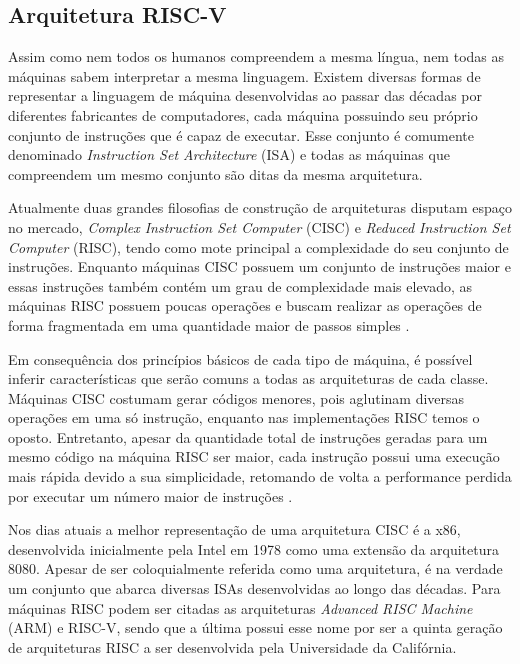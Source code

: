 \subsection{Arquitetura RISC-V}

Assim como nem todos os humanos compreendem a mesma língua, nem todas as máquinas sabem interpretar a mesma linguagem. Existem diversas formas de representar a linguagem de máquina desenvolvidas ao passar das décadas por diferentes fabricantes de computadores, cada máquina possuindo seu próprio conjunto de instruções que é capaz de executar. Esse conjunto é comumente denominado \textit{Instruction Set Architecture} (ISA) e todas as máquinas que compreendem um mesmo conjunto são ditas da mesma arquitetura.

Atualmente duas grandes filosofias de construção de arquiteturas disputam espaço no mercado, \textit{Complex Instruction Set Computer} (CISC) e \textit{Reduced Instruction Set Computer} (RISC), tendo como mote principal a complexidade do seu conjunto de instruções. Enquanto máquinas CISC possuem um conjunto de instruções maior e essas instruções também contém um grau de complexidade mais elevado, as máquinas RISC possuem poucas operações e buscam realizar as operações de forma fragmentada em uma quantidade maior de passos simples \cite{patterson_risc_i}.

Em consequência dos princípios básicos de cada tipo de máquina, é possível inferir características que serão comuns a todas as arquiteturas de cada classe. Máquinas CISC costumam gerar códigos menores, pois aglutinam diversas operações em uma só instrução, enquanto nas implementações RISC temos o oposto. Entretanto, apesar da quantidade total de instruções geradas para um mesmo código na máquina RISC ser maior, cada instrução possui uma execução mais rápida devido a sua simplicidade, retomando de volta a performance perdida por executar um número maior de instruções \cite{patterson_risc_i}.

Nos dias atuais a melhor representação de uma arquitetura CISC é a x86, desenvolvida inicialmente pela Intel em 1978 como uma extensão da arquitetura 8080. Apesar de ser coloquialmente referida como uma arquitetura, é na verdade um conjunto que abarca diversas ISAs desenvolvidas ao longo das décadas. Para máquinas RISC podem ser citadas as arquiteturas \textit{Advanced RISC Machine} (ARM) e RISC-V, sendo que a última possui esse nome por ser a quinta geração de arquiteturas RISC a ser desenvolvida pela Universidade da Califórnia.

